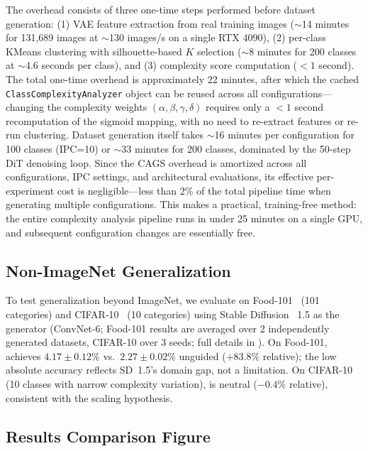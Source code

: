 The \cags{} overhead consists of three one-time steps performed before dataset generation: (1) VAE feature extraction from real training images ($\sim$14 minutes for 131{,}689 images at $\sim$130 images/s on a single RTX 4090), (2) per-class KMeans clustering with silhouette-based $K$ selection ($\sim$8 minutes for 200 classes at $\sim$4.6 seconds per class), and (3) complexity score computation ($<1$ second). The total one-time overhead is approximately 22 minutes, after which the cached \texttt{ClassComplexityAnalyzer} object can be reused across all configurations---changing the complexity weights $(\alpha, \beta, \gamma, \delta)$ requires only a $<1$ second recomputation of the sigmoid mapping, with no need to re-extract features or re-run clustering. Dataset generation itself takes $\sim$16 minutes per configuration for 100 classes (IPC=10) or $\sim$33 minutes for 200 classes, dominated by the 50-step DiT denoising loop. Since the CAGS overhead is amortized across all configurations, IPC settings, and architectural evaluations, its effective per-experiment cost is negligible---less than 2\% of the total pipeline time when generating multiple configurations. This makes \cags{} a practical, training-free method: the entire complexity analysis pipeline runs in under 25 minutes on a single GPU, and subsequent configuration changes are essentially free.

\subsection{Non-ImageNet Generalization}
\label{sec:non-imagenet-table}

To test generalization beyond ImageNet, we evaluate on Food-101~\cite{bossard2014food101} (101 categories) and CIFAR-10~\cite{krizhevsky2009learning} (10 categories) using Stable Diffusion~\cite{rombach2021highresolution} 1.5 as the generator (ConvNet-6; Food-101 \cags{} results are averaged over 2 independently generated datasets, CIFAR-10 over 3 seeds; full details in ). On Food-101, \cags{} achieves $4.17 \pm 0.12\%$ vs.\ $2.27 \pm 0.02\%$ unguided ($+83.8\%$ relative); the low absolute accuracy reflects SD~1.5's domain gap, not a \cags{} limitation. On CIFAR-10 (10 classes with narrow complexity variation), \cags{} is neutral ($-0.4\%$ relative), consistent with the scaling hypothesis.

\subsection{Results Comparison Figure}
\label{sec:results-figure}


